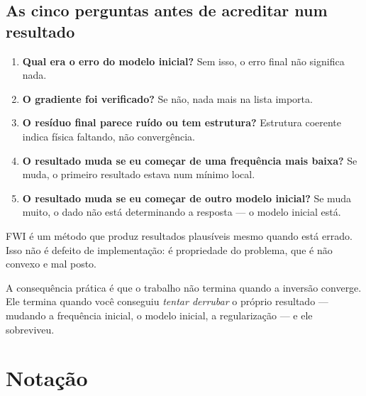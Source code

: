 \documentclass[11pt,a4paper,oneside]{report}
\begin{document}
\section{As cinco perguntas antes de acreditar num resultado}

\begin{enumerate}[leftmargin=*]
\item \textbf{Qual era o erro do modelo inicial?} Sem isso, o erro final n\~ao
significa nada.
\item \textbf{O gradiente foi verificado?} Se n\~ao, nada mais na lista
importa.
\item \textbf{O res\'iduo final parece ru\'ido ou tem estrutura?} Estrutura
coerente indica f\'isica faltando, n\~ao converg\^encia.
\item \textbf{O resultado muda se eu come\c{c}ar de uma frequ\^encia mais
baixa?} Se muda, o primeiro resultado estava num m\'inimo local.
\item \textbf{O resultado muda se eu come\c{c}ar de outro modelo inicial?} Se
muda muito, o dado n\~ao est\'a determinando a resposta --- o modelo inicial
est\'a.
\end{enumerate}

\begin{teoria}
FWI \'e um m\'etodo que produz resultados plaus\'iveis mesmo quando est\'a
errado. Isso n\~ao \'e defeito de implementa\c{c}\~ao: \'e propriedade do
problema, que \'e n\~ao convexo e mal posto.

A consequ\^encia pr\'atica \'e que o trabalho n\~ao termina quando a
invers\~ao converge. Ele termina quando voc\^e conseguiu \emph{tentar
derrubar} o pr\'oprio resultado --- mudando a frequ\^encia inicial, o modelo
inicial, a regulariza\c{c}\~ao --- e ele sobreviveu.
\end{teoria}

\appendix

\chapter{Nota\c{c}\~ao}
\end{document}

